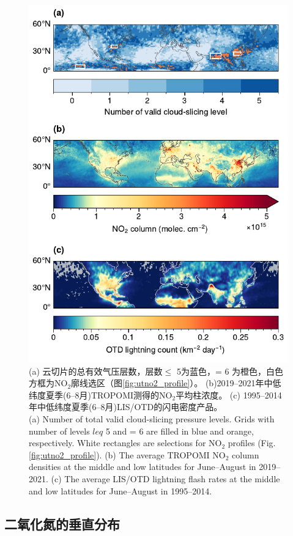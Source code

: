 \begin{figure}[!htbp]
    \centering
    \includegraphics[width=12cm]{./figures/no2_ltngcount.pdf}
    \caption{
    (a) 云切片的总有效气压层数，层数$\leq$ 5为蓝色，= 6 为橙色，白色方框为NO$_2$廓线选区（图\ref{fig:utno2_profile}）。
    (b)2019--2021年中低纬度夏季(6--8月)TROPOMI测得的NO$_2$平均柱浓度。
    (c) 1995--2014年中低纬度夏季(6--8月)LIS/OTD的闪电密度产品。 \\
    (a) Number of total valid cloud-slicing pressure levels.
    Grids with number of levels $leq$ 5 and = 6 are filled in blue and orange, respectively.
    White rectangles are selections for NO$_2$ profiles (Fig. \ref{fig:utno2_profile}).
    (b) The average TROPOMI NO$_2$ column densities at the middle and low latitudes for June--August in 2019--2021.
    (c) The average LIS/OTD lightning flash rates at the middle and low latitudes for June--August in 1995--2014.
    }
    \label{fig:no2_ltngcount}
\end{figure}

\subsection{二氧化氮的垂直分布} \label{sec:no2_profile}



